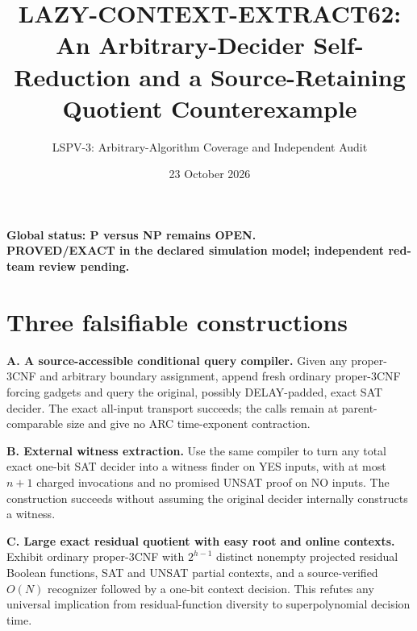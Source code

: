 \documentclass[11pt]{article}
\title{LAZY-CONTEXT-EXTRACT62: An Arbitrary-Decider Self-Reduction and a Source-Retaining Quotient Counterexample}
\author{LSPV-3: Arbitrary-Algorithm Coverage and Independent Audit}
\date{23 October 2026}
\begin{document}
\maketitle
\begin{center}\textbf{Global status: P versus NP remains OPEN.}\\
\textbf{PROVED/EXACT in the declared simulation model; independent red-team review pending.}\end{center}
\section{Three falsifiable constructions}
\noindent \textbf{A. A source-accessible conditional query compiler.}
Given any proper-3CNF and arbitrary boundary assignment, append fresh ordinary proper-3CNF forcing gadgets and query the original, possibly DELAY-padded, exact SAT decider. The exact all-input transport succeeds; the calls remain at parent-comparable size and give no ARC time-exponent contraction.
\par\noindent \textbf{B. External witness extraction.}
Use the same compiler to turn any total exact one-bit SAT decider into a witness finder on YES inputs, with at most $n+1$ charged invocations and no promised UNSAT proof on NO inputs. The construction succeeds without assuming the original decider internally constructs a witness.
\par\noindent \textbf{C. Large exact residual quotient with easy root and online contexts.}
Exhibit ordinary proper-3CNF with $2^{h-1}$ distinct nonempty projected residual Boolean functions, SAT and UNSAT partial contexts, and a source-verified $O(N)$ recognizer followed by a one-bit context decision. This refutes any universal implication from residual-function diversity to superpolynomial decision time.
\end{document}

